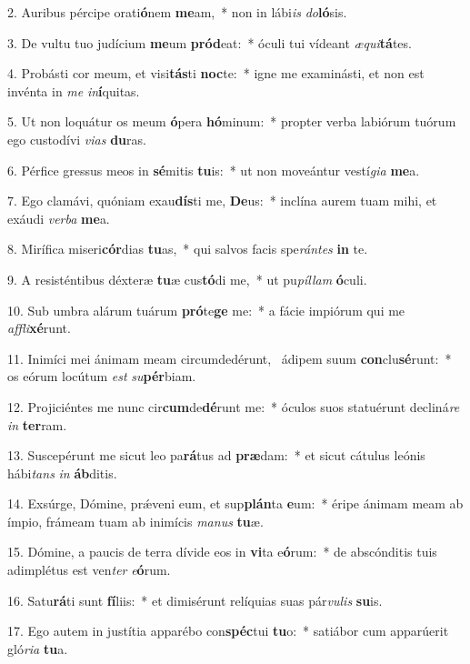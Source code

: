 2. Auribus pércipe orati\textbf{ó}nem \textbf{me}am,~*  non in lábi\textit{is} \textit{do}\textbf{ló}sis.\

3. De vultu tuo judícium \textbf{me}um \textbf{pród}eat:~*  óculi tui vídeant \textit{æ}\textit{qui}\textbf{tá}tes.\

4. Probásti cor meum, et visi\textbf{tás}ti \textbf{noc}te:~*  igne me examinásti, et non est invénta in \textit{me} \textit{in}\textbf{í}quitas.\

5. Ut non loquátur os meum \textbf{ó}pera \textbf{hó}minum:~*  propter verba labiórum tuórum ego custodívi \textit{vi}\textit{as} \textbf{du}ras.\

6. Pérfice gressus meos in \textbf{sé}mitis \textbf{tu}is:~*  ut non moveántur vestí\textit{gi}\textit{a} \textbf{me}a.\

7. Ego clamávi, quóniam exau\textbf{dís}ti me, \textbf{De}us:~*  inclína aurem tuam mihi, et exáudi \textit{ver}\textit{ba} \textbf{me}a.\

8. Mirífica miseri\textbf{cór}dias \textbf{tu}as,~*  qui salvos facis spe\textit{rán}\textit{tes} \textbf{in} te.\

9. A resisténtibus déxteræ \textbf{tu}æ cus\textbf{tó}di me,~*  ut pu\textit{píl}\textit{lam} \textbf{ó}culi.\

10. Sub umbra alárum tuárum \textbf{pró}te\textbf{ge} me:~*  a fácie impiórum qui me \textit{af}\textit{fli}\textbf{xé}runt.\

11. Inimíci mei ánimam meam circumdedérunt, \dag\  ádipem suum \textbf{con}clu\textbf{sé}runt:~*  os eórum locútum \textit{est} \textit{su}\textbf{pér}biam.\

12. Projiciéntes me nunc cir\textbf{cum}de\textbf{dé}runt me:~*  óculos suos statuérunt decliná\textit{re} \textit{in} \textbf{ter}ram.\

13. Suscepérunt me sicut leo pa\textbf{rá}tus ad \textbf{præ}dam:~*  et sicut cátulus leónis hábi\textit{tans} \textit{in} \textbf{áb}ditis.\

14. Exsúrge, Dómine, prǽveni eum, et sup\textbf{plán}ta \textbf{e}um:~*  éripe ánimam meam ab ímpio, frámeam tuam ab inimícis \textit{ma}\textit{nus} \textbf{tu}æ.\

15. Dómine, a paucis de terra dívide eos in \textbf{vi}ta e\textbf{ó}rum:~*  de abscónditis tuis adimplétus est ven\textit{ter} \textit{e}\textbf{ó}rum.\

16. Satu\textbf{rá}ti sunt \textbf{fí}liis:~*  et dimisérunt relíquias suas pár\textit{vu}\textit{lis} \textbf{su}is.\

17. Ego autem in justítia apparébo con\textbf{spéc}tui \textbf{tu}o:~*  satiábor cum apparúerit gló\textit{ri}\textit{a} \textbf{tu}a.\

